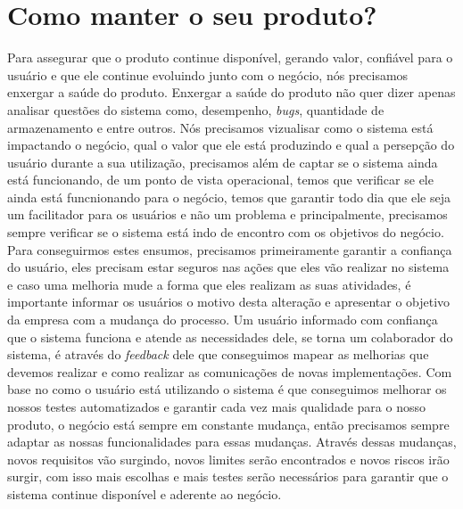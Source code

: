   \section{Como manter o seu produto?}
    Para assegurar que o produto continue disponível, gerando valor, confiável
    para o usuário e que ele continue evoluindo junto com o negócio, nós
    precisamos enxergar a saúde do produto. Enxergar a saúde do produto não quer
    dizer apenas analisar questões do sistema como, desempenho, \textit{bugs},
    quantidade de armazenamento e entre outros. Nós precisamos vizualisar como o
    sistema está impactando o negócio, qual o valor que ele está produzindo e
    qual a persepção do usuário durante a sua utilização, precisamos além de
    captar se o sistema ainda está funcionando, de um ponto de vista operacional,
    temos que verificar se ele ainda está funcnionando para o negócio, temos que
    garantir todo dia que ele seja um facilitador para os usuários e não um
    problema e principalmente, precisamos sempre verificar se o sistema está indo
    de encontro com os objetivos do negócio. \newline
    Para conseguirmos estes ensumos, precisamos primeiramente garantir a confiança
    do usuário, eles precisam estar seguros nas ações que eles vão realizar no
    sistema e caso uma melhoria mude a forma que eles realizam as suas atividades,
    é importante informar os usuários o motivo desta alteração e apresentar o
    objetivo da empresa com a mudança do processo. Um usuário informado com
    confiança que o sistema funciona e atende as necessidades dele, se torna
    um colaborador do sistema, é através do \textit{feedback} dele que conseguimos
    mapear as melhorias que devemos realizar e como realizar as comunicações de
    novas implementações. Com base no como o usuário está utilizando o sistema
    é que conseguimos melhorar os nossos testes automatizados e garantir cada vez
    mais qualidade para o nosso produto, o negócio está sempre em constante
    mudança, então precisamos sempre adaptar as nossas funcionalidades para essas
    mudanças. Através dessas mudanças, novos requisitos vão surgindo, novos
    limites serão encontrados e novos riscos irão surgir, com isso mais escolhas
    e mais testes serão necessários para garantir que o sistema continue
    disponível e aderente ao negócio.

